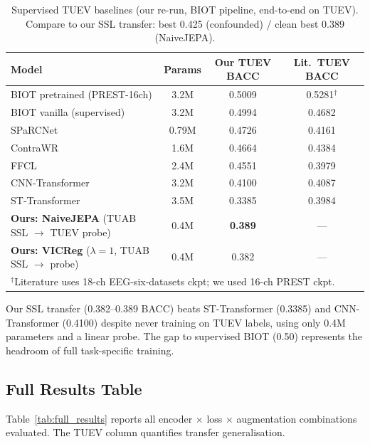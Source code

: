 \documentclass[11pt,a4paper]{article}
\begin{document}
\begin{table}[h]
\centering
\caption{Supervised TUEV baselines (our re-run, BIOT pipeline, end-to-end on TUEV).
  Compare to our SSL transfer: best 0.425 (confounded) / clean best 0.389 (NaiveJEPA).}
\label{tab:tuev_supervised}
\small
\begin{tabular}{lccc}
\toprule
\textbf{Model} & \textbf{Params} & \textbf{Our TUEV BACC} & \textbf{Lit.\ TUEV BACC} \\
\midrule
BIOT pretrained (PREST-16ch) & 3.2M & 0.5009 & 0.5281$^{\dagger}$ \\
BIOT vanilla (supervised) & 3.2M & 0.4994 & 0.4682 \\
SPaRCNet & 0.79M & 0.4726 & 0.4161 \\
ContraWR & 1.6M & 0.4664 & 0.4384 \\
FFCL & 2.4M & 0.4551 & 0.3979 \\
CNN-Transformer & 3.2M & 0.4100 & 0.4087 \\
ST-Transformer & 3.5M & 0.3385 & 0.3984 \\
\midrule
\textbf{Ours: NaiveJEPA} (TUAB SSL $\to$ TUEV probe) & 0.4M & \textbf{0.389} & --- \\
\textbf{Ours: VICReg} ($\lambda{=}1$, TUAB SSL $\to$ probe) & 0.4M & 0.382 & --- \\
\bottomrule
\multicolumn{4}{l}{$^{\dagger}$Literature uses 18-ch EEG-six-datasets ckpt; we used 16-ch PREST ckpt.}
\end{tabular}
\end{table}

Our SSL transfer (0.382--0.389 BACC) beats ST-Transformer (0.3385) and CNN-Transformer (0.4100)
despite never training on TUEV labels, using only 0.4M parameters and a linear probe.
The gap to supervised BIOT (0.50) represents the headroom of full task-specific training.

\subsection{Full Results Table}
\label{sec:full_results}

Table~\ref{tab:full_results} reports all encoder $\times$ loss $\times$ augmentation
combinations evaluated.  The TUEV column quantifies transfer generalisation.
\end{document}
